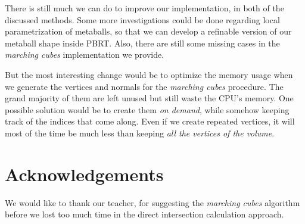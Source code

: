 \documentclass[conference]{acmsiggraph}
\begin{document}
There is still much we can do to improve our implementation, in both of the
discussed methods. Some more investigations could be done regarding local
parametrization of metaballs, so that we can develop a refinable version of
our metaball shape inside PBRT. Also, there are still some missing cases in
the \textit{marching cubes} implementation we provide.

But the most interesting change would be to optimize the memory usage when we
generate the vertices and normals for the \textit{marching cubes} procedure.
The grand majority of them are left unused but still waste the CPU's memory.
One possible solution would be to create them \textit{on demand}, while somehow
keeping track of the indices that come along. Even if we create repeated
vertices, it will most of the time be much less than keeping \textit{all the
vertices of the volume}.

\section*{Acknowledgements}

We would like to thank our teacher, for suggesting the \textit{marching cubes}
algorithm before we lost too much time in the direct intersection calculation
approach.



\end{document}
